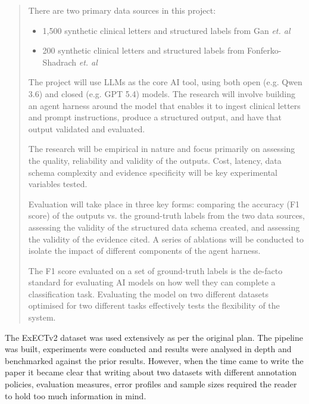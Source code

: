 \documentclass[conference]{IEEEtran}
\begin{document}
\begin{quote}
\vspace{0.2em}
There are two primary data sources in this project:

\vspace{0.2em}
\begin{itemize}
\item 1,500 synthetic clinical letters and structured labels from Gan \emph{et. al} \cite{b5}
\item 200 synthetic clinical letters and structured labels from Fonferko-Shadrach \emph{et. al}\cite{b3}
\end{itemize}

\vspace{0.2em}
The project will use LLMs as the core AI tool, using both open (e.g. Qwen 3.6) and closed
(e.g. GPT 5.4) models. The research will involve building an agent harness around the
model that enables it to ingest clinical letters and prompt instructions, produce a
structured output, and have that output validated and evaluated.

\vspace{0.2em}
The research will be empirical in nature and focus primarily on assessing the quality,
reliability and validity of the outputs. Cost, latency, data schema complexity and
evidence specificity will be key experimental variables tested.

\vspace{0.2em}
Evaluation will take place in three key forms: comparing the accuracy (F1 score) of the
outputs vs. the ground-truth labels from the two data sources, assessing the validity of
the structured data schema created, and assessing the validity of the evidence cited. A
series of ablations will be conducted to isolate the impact of different components of
the agent harness.

\vspace{0.2em}
The F1 score evaluated on a set of ground-truth labels is the de-facto standard for
evaluating AI models on how well they can complete a classification task. Evaluating
the model on two different datasets optimised for two different tasks effectively tests
the flexibility of the system. 

\end{quote}

The ExECTv2 dataset \cite{b3} was used extensively
as per the original plan. The pipeline was built, 
experiments were conducted and results were analysed in 
depth and benchmarked against the prior results. 
However, when the time came to write the paper
it became clear that writing about two datasets
with different annotation policies, evaluation measures,
error profiles and sample sizes required the reader
to hold too much information in mind. 
\end{document}
